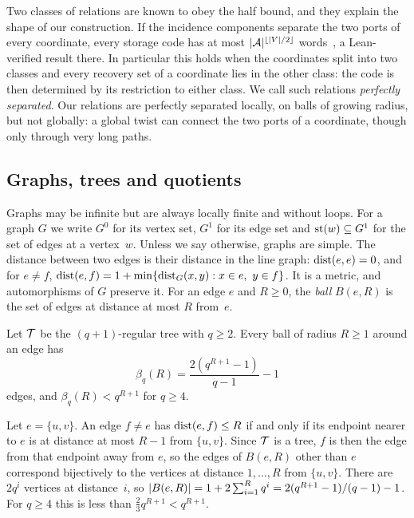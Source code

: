 Two classes of relations are known to obey the half bound, and they explain the shape of our construction. If the
incidence components separate the two ports of every coordinate, every storage code has at most
$\lvert \mathcal A \rvert^{\lfloor\lvert V \rvert/2\rfloor}$ words~\cite[Lemma~4.1]{DirectedRecovery2026}, a Lean-verified result there.
In particular this holds when the coordinates split into two classes and every recovery set of a coordinate lies in the
other class: the code is then determined by its restriction to either class. We call such relations \emph{perfectly
separated}. Our relations are perfectly separated locally, on balls of growing radius, but not globally: a global twist
can connect the two ports of a coordinate, though only through very long paths.

\subsection{Graphs, trees and quotients}\label{sec:prelim-graphs}

Graphs may be infinite but are always locally finite and without loops. For a graph $G$ we write $G^0$ for its vertex
set, $G^1$ for its edge set and $\operatorname{st}(w)\subseteq G^1$ for the set of edges at a vertex~$w$. Unless we say otherwise,
graphs are simple. The distance between two edges is their distance in the line graph: $\operatorname{dist}(e,e)=0$, and for $e\ne f$,
$\operatorname{dist}(e,f)=1+\min\{\operatorname{dist}_G(x,y):x\in e,\ y\in f\}$. It is a metric, and automorphisms of $G$ preserve it. For an edge
$e$ and $R\ge0$, the \emph{ball} $B(e,R)$ is the set of edges at distance at most $R$ from~$e$.

\begin{lemma}\label{lem:ball}
\notformalized
Let $\mathcal{T}$ be the $(q+1)$-regular tree with $q\ge2$. Every ball of radius $R\ge1$ around an edge has
\[
  \beta_q(R)=\frac{2(q^{R+1}-1)}{q-1}-1
\]
edges, and $\beta_q(R)<q^{R+1}$ for $q\ge4$.
\end{lemma}
\begin{informalproof}
Let $e=\{u,v\}$. An edge $f\ne e$ has $\operatorname{dist}(e,f)\le R$ if and only if its endpoint nearer to $e$ is at distance at
most $R-1$ from $\{u,v\}$. Since $\mathcal{T}$ is a tree, $f$ is then the edge from that endpoint away from $e$, so the edges
of $B(e,R)$ other than $e$ correspond bijectively to the vertices at distance $1,\dots,R$ from $\{u,v\}$. There are $2q^i$
vertices at distance~$i$, so $\lvert B(e,R) \rvert=1+2\sum_{i=1}^Rq^i=2(q^{R+1}-1)/(q-1)-1$. For $q\ge4$ this is less than
$\tfrac23q^{R+1}<q^{R+1}$.
\end{informalproof}

